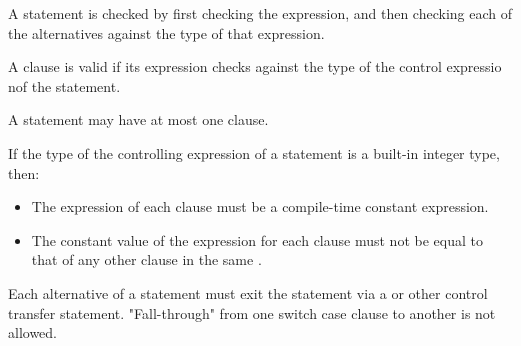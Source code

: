 \begin{Description}
A  statement is checked by first checking the expression, and then checking each of the alternatives against the type of that expression.
\end{Description}

\begin{Checking}
	\vspace{1em}

	\vspace{1em}

	\vspace{1em}

\end{Checking}

\begin{Description}
A  clause is valid if its expression checks against the type of the control expressio nof the  statement.
\end{Description}

A  statement may have at most one  clause.

If the type of the controlling expression of a  statement is a built-in integer type, then:

\begin{itemize}
\item The expression of each  clause must be a compile-time constant expression.
\item The constant value of the expression for each  clause must not be equal to that of any other  clause in the same .
\end{itemize}

Each alternative of a  statement must exit the  statement via a  or other control transfer statement.
"Fall-through" from one switch case clause to another is not allowed.


